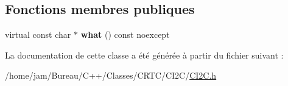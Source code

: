 \subsection*{Fonctions membres publiques}
\begin{DoxyCompactItemize}
\item 
\hypertarget{classCI2C_1_1ErreurSlaveNotDefine_a7efd5525f6598a091e21519cfcc3cd95}{virtual const char $\ast$ {\bfseries what} () const noexcept}\label{classCI2C_1_1ErreurSlaveNotDefine_a7efd5525f6598a091e21519cfcc3cd95}

\end{DoxyCompactItemize}


La documentation de cette classe a été générée à partir du fichier suivant \+:\begin{DoxyCompactItemize}
\item 
/home/jam/\+Bureau/\+C++/\+Classes/\+C\+R\+T\+C/\+C\+I2\+C/\hyperlink{CI2C_8h}{C\+I2\+C.\+h}\end{DoxyCompactItemize}
